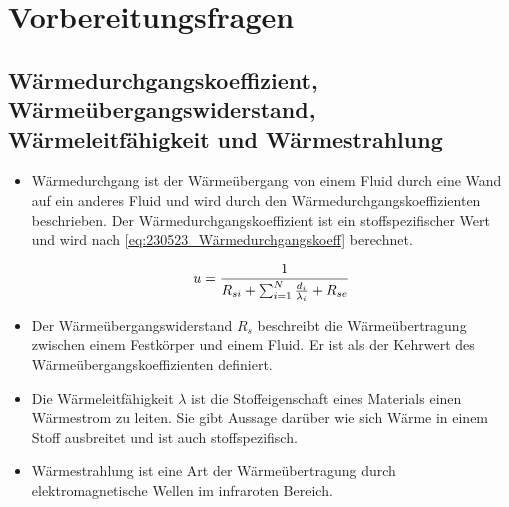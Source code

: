 \section{Vorbereitungsfragen}
\subsection{Wärmedurchgangskoeffizient, Wärmeübergangswiderstand, Wärmeleitfähigkeit und Wärmestrahlung}

\begin{itemize}
\item Wärmedurchgang ist der Wärmeübergang von einem Fluid durch eine Wand auf ein anderes Fluid und wird durch den Wärmedurchgangskoeffizienten beschrieben. Der Wärmedurchgangskoeffizient ist ein stoffspezifischer Wert und wird nach \autoref{eq:230523_Wärmedurchgangskoeff} berechnet. 
 
\begin{equation}
	\centering
	u=\frac{1}{R_{si}+\sum_{i=1}^N \frac{d_i}{\lambda_i}+R_{se}}
	\label{eq:230523_Wärmedurchgangskoeff}
\end{equation}

\item Der Wärmeübergangswiderstand $R_s$ beschreibt die Wärmeübertragung zwischen einem Festkörper und einem Fluid. Er ist als der Kehrwert des Wärmeübergangskoeffizienten definiert.

\item Die Wärmeleitfähigkeit $\lambda$ ist die Stoffeigenschaft eines Materials einen Wärmestrom zu leiten. Sie gibt Aussage darüber wie sich Wärme in einem Stoff ausbreitet und ist auch stoffspezifisch.

\item Wärmestrahlung ist eine Art der Wärmeübertragung durch elektromagnetische Wellen im infraroten Bereich.

\end{itemize}





